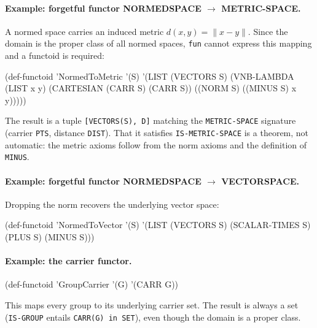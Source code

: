 \paragraph{Example: forgetful functor NORMEDSPACE $\to$ METRIC-SPACE.}
A normed space carries an induced metric $d(x,y) = \|x - y\|$.
Since the domain is the proper class of all normed spaces, \texttt{fun}
cannot express this mapping and a functoid is required:

\begin{VNBcode}
(def-functoid 'NormedToMetric '(S)
  '(LIST (VECTORS S)
         (VNB-LAMBDA (LIST x y) (CARTESIAN (CARR S) (CARR S)) ((NORM S) ((MINUS S) x y)))))
\end{VNBcode}

The result is a tuple \texttt{[VECTORS(S), D]} matching the
\texttt{METRIC-SPACE} signature (carrier \texttt{PTS}, distance \texttt{DIST}).
That it satisfies \texttt{IS-METRIC-SPACE} is a theorem, not automatic:
the metric axioms follow from the norm axioms and the definition of
\texttt{MINUS}.

\paragraph{Example: forgetful functor NORMEDSPACE $\to$ VECTORSPACE.}
Dropping the norm recovers the underlying vector space:

\begin{VNBcode}
(def-functoid 'NormedToVector '(S)
  '(LIST (VECTORS S) (SCALAR-TIMES S) (PLUS S) (MINUS S)))
\end{VNBcode}

\paragraph{Example: the carrier functor.}
\begin{VNBcode}
(def-functoid 'GroupCarrier '(G) '(CARR G))
\end{VNBcode}
This maps every group to its underlying carrier set.  The result is
always a set (\texttt{IS-GROUP} entails \texttt{CARR(G) in SET}),
even though the domain is a proper class.

